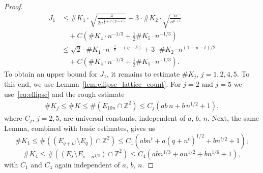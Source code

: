 \documentclass[10pt,a4paper]{amsart}
\newcommand{\Z}{{\mathbb Z}}
\begin{document}
\begin{proof}
    \begin{equation}\label{eq:sum_update}
        \begin{split}
          J_1
            & \leq \#K_1 \cdot \sqrt{\tfrac{4}{2 n^{\frac{1}{3}+2(\eta -\delta)}}} 
            + 3\cdot \#K_2\cdot \sqrt{\tfrac{n}{n^{p+t}}} \\
            & \quad + C \left(\#K_4\cdot n^{-1/3} +\tfrac{1}{2}\# K_5 \cdot n^{-1/3}\right) \\
            &\leq 
            \sqrt{2} \cdot \#K_1 \cdot n^{-\frac{1}{6}-(\eta-\delta)} 
            + 3 \cdot \#K_2\cdot n^{(1-p-t)/2}\\
            & \quad + C \left(\#K_4\cdot n^{-1/3} +\tfrac{1}{2}\# K_5 \cdot n^{-1/3}\right).
        \end{split}
    \end{equation}
    To obtain an upper bound for $J_1$, it remains to estimate $\#K_j$, $j=1,2,4,5$. To this end, we use Lemma~\ref{lem:ellipse_lattice_count}. For $j=2$ and $j=5$ we use~\eqref{eq:ellipse} and the rough estimate  
    \begin{align}\label{eq:K25ab}
        \# K_j
         \leq \#K \leq \#(E_{10n}\cap \Z^2)
         \leq C_j (ab \, n + b \, n^{1/2} + 1),
    \end{align}
    where $C_j$, $j=2,5$, are universal constants, independent of $a, \, b, \, n$.
    Next, the same Lemma, combined with basic estimates, gives us
    \begin{equation}\label{eq:K1ab}
        \# K_1 \leq \#((E_{q+n^t} \setminus E_{q})\cap \Z^2) \leq C_1 ( ab n^{t} + a(q+n^t)^{1/2} + bn^{t/2}+1);
    \end{equation}
    \begin{equation}\label{eq:K4ab}
        \# K_4 \leq \#((E_{s} \setminus E_{s-n^{1/3}})\cap \Z^2)
        \leq C_4 ( ab n^{1/3} + a n^{1/2} + bn^{1/6}+1),
    \end{equation}
    with $C_1$ and $C_4$ again independent of $a, \, b, \, n$.


\end{proof}
\end{document}
